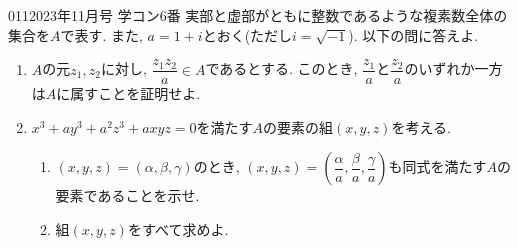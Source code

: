 \begin{prob}{011}{}{2023年11月号 学コン6番}
 実部と虚部がともに整数であるような複素数全体の集合を$A$で表す. また, $a=1+i$とおく(ただし$i=\sqrt{-1}$). 以下の問に答えよ.
 \begin{enumerate}
  \item $A$の元$z_1,z_2$に対し, $\dfrac{z_1z_2}{a}\in A$であるとする. このとき, $\dfrac{z_1}{a}$と$\dfrac{z_2}{a}$のいずれか一方は$A$に属すことを証明せよ.
  \item $x^3 + ay^3 + a^2 z^3 + axyz = 0$を満たす$A$の要素の組$(x,y,z)$を考える.
  \begin{enumerate}
   \item $(x,y,z)=(\alpha,\beta,\gamma)$のとき, $(x,y,z)=(\dfrac{\alpha}{a},\dfrac{\beta}{a},\dfrac{\gamma}{a})$も同式を満たす$A$の要素であることを示せ.
   \item 組$(x,y,z)$をすべて求めよ.
  \end{enumerate}
 \end{enumerate}
\end{prob}
